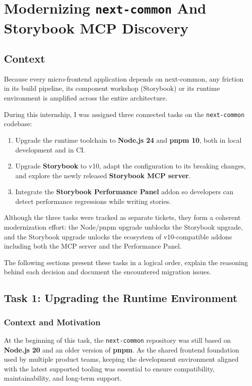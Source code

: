 \chapter{Modernizing \texttt{next-common} And Storybook MCP Discovery}

\section{Context}

Because every micro-frontend application depends on next-common, any friction in its build pipeline, its component workshop (Storybook) or its runtime environment is amplified across the entire architecture.

During this internship, I was assigned three connected tasks on the \texttt{next-common} codebase:

\begin{enumerate}
    \item Upgrade the runtime toolchain to \textbf{Node.js 24} and \textbf{pnpm 10}, both in local development and in \acf{CI}.
    \item Upgrade \textbf{Storybook} to v10, adapt the configuration to its breaking changes, and explore the newly released \textbf{Storybook MCP server}.
    \item Integrate the \textbf{Storybook Performance Panel} addon so developers can detect performance regressions while writing stories.
\end{enumerate}

Although the three tasks were tracked as separate tickets, they form a coherent modernization effort: the Node/pnpm upgrade unblocks the Storybook upgrade, and the Storybook upgrade unlocks the ecosystem of v10-compatible addons including both the MCP server and the Performance Panel.

The following sections present these tasks in a logical order, explain the reasoning behind each decision and document the encountered migration issues.

\section{Task 1: Upgrading the Runtime Environment}

\subsection{Context and Motivation}

At the beginning of this task, the \texttt{next-common} repository was still based on \textbf{Node.js 20} and an older version of \textbf{pnpm}. As the shared frontend foundation used by multiple product teams, keeping the development environment aligned with the latest supported tooling was essential to ensure compatibility, maintainability, and long-term support.

